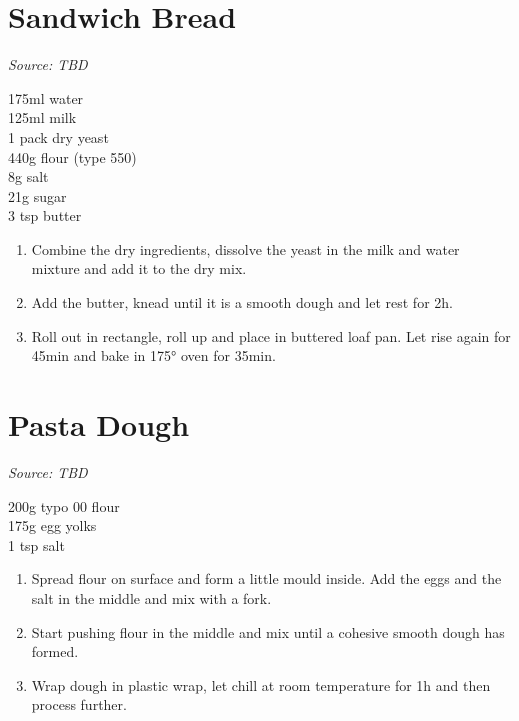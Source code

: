 \documentclass{report}
\begin{document}
\section{Sandwich Bread}
\textit{Source: TBD}\\
\begin{minipage}[t]{0.21\textwidth} \vspace{0pt} 
175ml water\\
125ml milk\\
1 pack dry yeast\\
440g flour (type 550)\\
8g salt\\
21g sugar\\
3 tsp butter
\end{minipage}
\hfill
\begin{minipage}[t]{0.78\textwidth} \vspace{0pt}
	\begin{enumerate}
		\item Combine the dry ingredients, dissolve the yeast in the milk and water mixture and add it to the dry mix.
		\item Add the butter, knead until it is a smooth dough and let rest for 2h.
		\item Roll out in rectangle, roll up and place in buttered loaf pan. Let rise again for 45min and bake in 175° oven for 35min.
	\end{enumerate}	
\end{minipage}

\section{Pasta Dough}
\textit{Source: TBD}\\
\begin{minipage}[t]{0.21\textwidth} \vspace{0pt} 
200g typo 00 flour\\
175g egg yolks\\
1 tsp salt
\end{minipage}
\hfill
\begin{minipage}[t]{0.78\textwidth} \vspace{0pt}
	\begin{enumerate}
		\item Spread flour on surface and form a little mould inside. Add the eggs and the salt in the middle and mix with a fork.
		\item Start pushing flour in the middle and mix until a cohesive smooth dough has formed.
		\item Wrap dough in plastic wrap, let chill at room temperature for 1h and then process further.
	\end{enumerate}	
\end{minipage}
\end{document}
